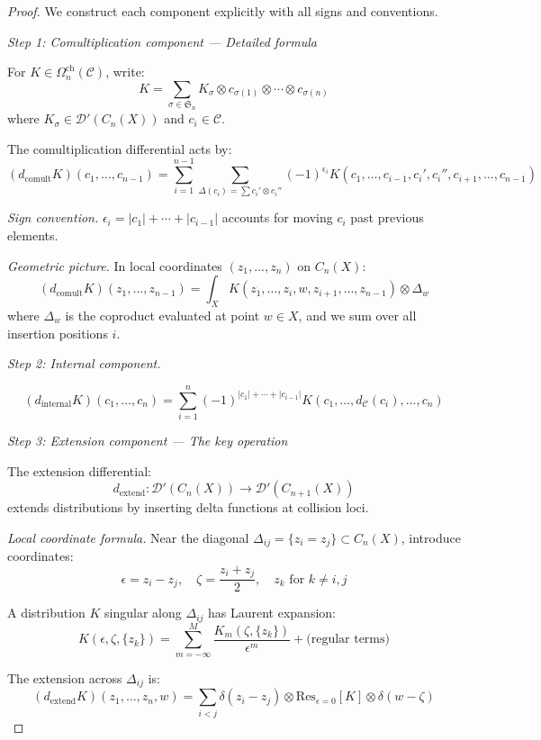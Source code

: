 \begin{proof}
We construct each component explicitly with all signs and conventions.

\emph{Step 1: Comultiplication component — Detailed formula}

For $K \in \Omega^{\text{ch}}_n(\mathcal{C})$, write:
\[K = \sum_{\sigma \in \mathfrak{S}_n} K_\sigma \otimes c_{\sigma(1)} \otimes \cdots 
\otimes c_{\sigma(n)}\]
where $K_\sigma \in \mathcal{D}'(C_n(X))$ and $c_i \in \mathcal{C}$.

The comultiplication differential acts by:
\[(d_{\text{comult}}K)(c_1, \ldots, c_{n-1}) = \sum_{i=1}^{n-1} \sum_{\Delta(c_i) = 
\sum c_i' \otimes c_i''} (-1)^{\epsilon_i} K(c_1, \ldots, c_{i-1}, c_i', c_i'', 
c_{i+1}, \ldots, c_{n-1})\]

\emph{Sign convention.} $\epsilon_i = |c_1| + \cdots + |c_{i-1}|$ accounts for 
moving $c_i$ past previous elements.

\emph{Geometric picture.} In local coordinates $(z_1, \ldots, z_n)$ on $C_n(X)$:
\[
(d_{\text{comult}}K)(z_1, \ldots, z_{n-1}) = \int_X K(z_1, \ldots, z_i, w, z_{i+1}, 
\ldots, z_{n-1}) \otimes \Delta_w
\]
where $\Delta_w$ is the coproduct evaluated at point $w \in X$, and we sum over 
all insertion positions $i$.

\emph{Step 2: Internal component.}

\[(d_{\text{internal}}K)(c_1, \ldots, c_n) = \sum_{i=1}^n (-1)^{|c_1| + \cdots +
|c_{i-1}|} K(c_1, \ldots, d_{\mathcal{C}}(c_i), \ldots, c_n)\]

\emph{Step 3: Extension component — The key operation}

The extension differential:
\[
d_{\text{extend}}: \mathcal{D}'(C_n(X)) \to \mathcal{D}'(C_{n+1}(X))
\]
extends distributions by inserting delta functions at collision loci.

\emph{Local coordinate formula.} Near the diagonal $\Delta_{ij} = \{z_i = z_j\} 
\subset C_n(X)$, introduce coordinates:
\[\epsilon = z_i - z_j, \quad \zeta = \frac{z_i + z_j}{2}, \quad z_k \text{ for } k 
\neq i,j\]

A distribution $K$ singular along $\Delta_{ij}$ has Laurent expansion:
\[K(\epsilon, \zeta, \{z_k\}) = \sum_{m=-\infty}^{M} \frac{K_m(\zeta, \{z_k\})}{\epsilon^m} 
+ \text{(regular terms)}\]

The extension across $\Delta_{ij}$ is:
\[
(d_{\text{extend}}K)(z_1, \ldots, z_n, w) = \sum_{i<j} \delta(z_i - z_j) \otimes 
\text{Res}_{\epsilon=0}[K] \otimes \delta(w - \zeta)
\]


\end{proof}
